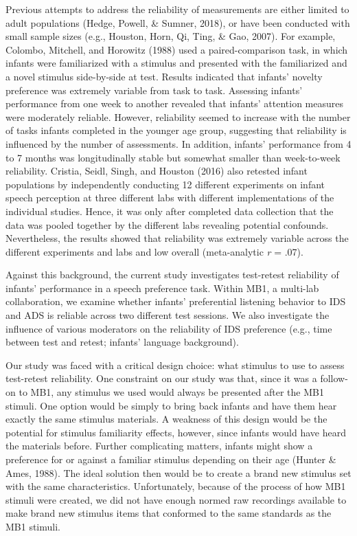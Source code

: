 \documentclass[
  man,floatsintext]{apa6}
\begin{document}
Previous attempts to address the reliability of measurements are either limited to adult populations (Hedge, Powell, \& Sumner, 2018), or have been conducted with small sample sizes (e.g., Houston, Horn, Qi, Ting, \& Gao, 2007).
For example, Colombo, Mitchell, and Horowitz (1988) used a paired-comparison task, in which infants were familiarized with a stimulus and presented with the familiarized and a novel stimulus side-by-side at test.
Results indicated that infants' novelty preference was extremely variable from task to task.
Assessing infants' performance from one week to another revealed that infants' attention measures were moderately reliable.
However, reliability seemed to increase with the number of tasks infants completed in the younger age group, suggesting that reliability is influenced by the number of assessments.
In addition, infants' performance from 4 to 7 months was longitudinally stable but somewhat smaller than week-to-week reliability.
Cristia, Seidl, Singh, and Houston (2016) also retested infant populations by independently conducting 12 different experiments on infant speech perception at three different labs with different implementations of the individual studies.
Hence, it was only after completed data collection that the data was pooled together by the different labs revealing potential confounds.
Nevertheless, the results showed that reliability was extremely variable across the different experiments and labs and low overall (meta-analytic \emph{r} = .07).

Against this background, the current study investigates test-retest reliability of infants' performance in a speech preference task.
Within MB1, a multi-lab collaboration, we examine whether infants' preferential listening behavior to IDS and ADS is reliable across two different test sessions.
We also investigate the influence of various moderators on the reliability of IDS preference (e.g., time between test and retest; infants' language background).

Our study was faced with a critical design choice: what stimulus to use to assess test-retest reliability.
One constraint on our study was that, since it was a follow-on to MB1, any stimulus we used would always be presented after the MB1 stimuli.
One option would be simply to bring back infants and have them hear exactly the same stimulus materials.
A weakness of this design would be the potential for stimulus familiarity effects, however, since infants would have heard the materials before.
Further complicating matters, infants might show a preference for or against a familiar stimulus depending on their age (Hunter \& Ames, 1988).
The ideal solution then would be to create a brand new stimulus set with the same characteristics.
Unfortunately, because of the process of how MB1 stimuli were created, we did not have enough normed raw recordings available to make brand new stimulus items that conformed to the same standards as the MB1 stimuli.
\end{document}
